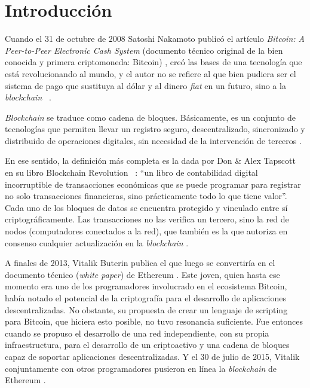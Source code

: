 \chapter*{Introducción}\label{chapter:introduction}


  Cuando el 31 de octubre de 2008 Satoshi Nakamoto publicó el artículo \textit{Bitcoin: A Peer-to-Peer Electronic Cash System} (documento 
  técnico original de la bien conocida y primera criptomoneda: Bitcoin) , creó las bases de una tecnología que 
  está revolucionando al mundo, y el autor no se refiere al que bien pudiera ser el sistema de pago que sustituya al dólar y al dinero 
  \textit{fiat} en un futuro, sino a la \textit{blockchain} ~\parencite{satoshi2008}.
  
  \textit{Blockchain} se traduce como cadena de bloques. Básicamente, es un conjunto de tecnologías que permiten llevar un registro 
  seguro, descentralizado, sincronizado y distribuido de operaciones digitales, sin necesidad de la intervención de terceros 
  \parencite{solunion2021}.

  En ese sentido, la definición más completa es la dada por Don \& Alex Tapscott en su libro Blockchain Revolution
  ~\parencite{tapscott2016blockchain}: “un libro de 
  contabilidad digital incorruptible de transacciones económicas que se puede programar para registrar no solo transacciones financieras, 
  sino prácticamente todo lo que tiene valor”. Cada uno de los bloques de datos se encuentra protegido y vinculado entre sí 
  criptográficamente. Las transacciones no las verifica un tercero, sino la red 
  de nodos (computadores conectados a la red), que también es la que autoriza en consenso cualquier actualización en la \textit{blockchain} 
  \parencite{solunion2021}.

  A finales de 2013, Vitalik Buterin publica el que luego se convertiría en el documento técnico (\textit{white paper}) de Ethereum 
  \parencite{buterin2013}. Este joven, quien hasta ese momento era uno de los
  programadores involucrado en el ecosistema Bitcoin, había notado el potencial de la criptografía para el desarrollo de aplicaciones 
  descentralizadas. No obstante, su propuesta de crear un lenguaje de scripting para Bitcoin, que hiciera esto posible, no tuvo resonancia 
  suficiente. Fue entonces cuando se propuso el desarrollo de una red independiente, con su propia infraestructura, para el desarrollo de 
  un criptoactivo y una cadena de bloques capaz de soportar aplicaciones descentralizadas. Y el 30 de julio de 2015, Vitalik conjuntamente
  con otros programadores pusieron en línea la \textit{blockchain} de Ethereum \parencite{diaz2018}. 
  
